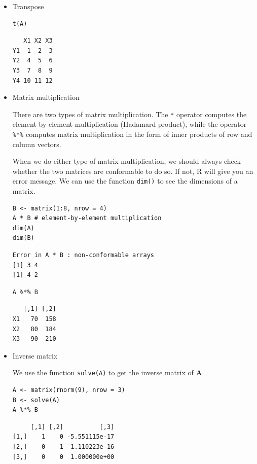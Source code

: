 \documentclass[a4paper,11pt]{article}
\begin{document}
\begin{itemize}
\item Transpose
\label{sec:org91e9a40}

\begin{verbatim}
t(A)
\end{verbatim}

\begin{verbatim}
   X1 X2 X3
Y1  1  2  3
Y2  4  5  6
Y3  7  8  9
Y4 10 11 12
\end{verbatim}

\item Matrix multiplication
\label{sec:org54708c3}

There are two types of matrix multiplication. The \texttt{*} operator
computes the element-by-element multiplication (Hadamard product),
while the operator \texttt{\%*\%} computes matrix multiplication in the form of
inner products of row and column vectors.

When we do either type of matrix multiplication, we should always
check whether the two matrices are conformable to do so. If not, R
will give you an error message. We can use the function \texttt{dim()} to see
the dimensions of a matrix.

\begin{verbatim}
B <- matrix(1:8, nrow = 4)
A * B # element-by-element multiplication
dim(A)
dim(B)
\end{verbatim}

\begin{verbatim}
Error in A * B : non-conformable arrays
[1] 3 4
[1] 4 2
\end{verbatim}

\begin{verbatim}
A %*% B
\end{verbatim}

\begin{verbatim}
   [,1] [,2]
X1   70  158
X2   80  184
X3   90  210
\end{verbatim}

\item Inverse matrix
\label{sec:org8fc0ab4}

We use the function \texttt{solve(A)} to get the inverse matrix of
\(\mathbf{A}\).

\begin{verbatim}
A <- matrix(rnorm(9), nrow = 3)
B <- solve(A)
A %*% B
\end{verbatim}

\begin{verbatim}
     [,1] [,2]          [,3]
[1,]    1    0 -5.551115e-17
[2,]    0    1  1.110223e-16
[3,]    0    0  1.000000e+00
\end{verbatim}


\end{itemize}
\end{document}
